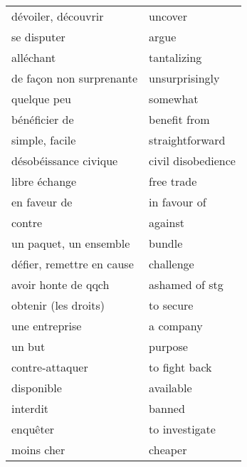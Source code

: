 \documentclass[
  10pt,
]{article}
\begin{document}
\begin{longtable}{ll}
dévoiler, découvrir & uncover\\

\rowcolor{gray!6}  se disputer & argue\\

alléchant & tantalizing\\

\rowcolor{gray!6}  de façon non surprenante & unsurprisingly\\

quelque peu & somewhat\\

\rowcolor{gray!6}  bénéficier de & benefit from\\

simple, facile & straightforward\\

\rowcolor{gray!6}  désobéissance civique & civil disobedience\\

libre échange & free trade\\

\rowcolor{gray!6}  en faveur de & in favour of\\

contre & against\\

\rowcolor{gray!6}  un paquet, un ensemble & bundle\\

défier, remettre en cause & challenge\\

\rowcolor{gray!6}  avoir honte de qqch & ashamed of stg\\

obtenir (les droits) & to secure\\

\rowcolor{gray!6}  une entreprise & a \vphantom{1} company\\


un but & purpose\\

\rowcolor{gray!6}  contre-attaquer & to fight back\\

disponible & available\\

\rowcolor{gray!6}  interdit & banned\\

enquêter & to investigate\\

\rowcolor{gray!6}  moins cher & cheaper\\


\end{longtable}
\end{document}
